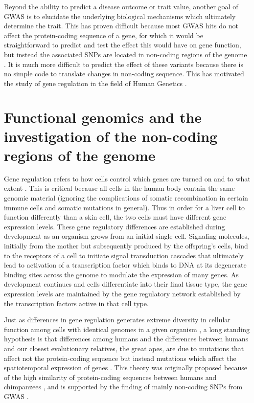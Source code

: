 Beyond the ability to predict a disease outcome or trait value,
another goal of GWAS is to elucidate the underlying biological
mechanisms which ultimately determine the trait. This has proven
difficult because most GWAS hits do not affect the protein-coding
sequence of a gene, for which it would be straightforward to predict
and test the effect this would have on gene function, but instead the
associated SNPs are located in non-coding regions of the genome \citep{Hindorff2009, Manolio2009}. It is
much more difficult to predict the effect of these variants because
there is no simple code to translate changes in non-coding
sequence. This has motivated the study of gene regulation in the field
of Human Genetics \citep{Lappalainen2010, Trynka2013, Lappalainen2015}.

\section{Functional genomics and the investigation of the non-coding regions of the genome}

Gene regulation refers to how cells control which genes are turned on
and to what extent \citep{Davidson2010, Natoli2010, Strachan2011, Ostuni2013, Tsankov2015}. This is critical because all cells in the human
body contain the same genomic material (ignoring the complications of
somatic recombination in certain immune cells and somatic mutations in
general). Thus in order for a liver cell to function differently than
a skin cell, the two cells must have different gene expression
levels. These gene regulatory differences are established during
development as an organism grows from an initial single
cell. Signaling molecules, initially from the mother but subsequently
produced by the offspring’s cells, bind to the receptors of a cell to
initiate signal transduction cascades that ultimately lead to
activation of a transcription factor which binds to DNA at its
degenerate binding sites across the genome to modulate the expression
of many genes. As development continues and cells differentiate into
their final tissue type, the gene expression levels are maintained by
the gene regulatory network established by the transcription factors
active in that cell type.

Just as differences in gene regulation generates extreme diversity in
cellular function among cells with identical genomes in a given
organism \citep{Natoli2010}, a long standing hypothesis is that differences among humans
and the differences between humans and our closest evolutionary
relatives, the great apes, are due to mutations that affect not the
protein-coding sequence but instead mutations which affect the
spatiotemporal expression of genes \citep{Britten1969, King1975, Carroll2008}. This theory was originally
proposed because of the high similarity of protein-coding sequences
between humans and chimpanzees \citep{King1975}, and is supported by the finding of
mainly non-coding SNPs from GWAS \citep{Welter2014}.

